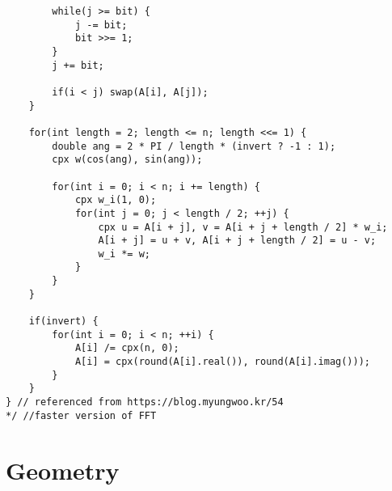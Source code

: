 \documentclass[landscape, 8pt, a4paper, oneside, twocolumn]{extarticle}
\begin{document}
\begin{verbatim}
        while(j >= bit) {
            j -= bit;
            bit >>= 1;
        }
        j += bit;

        if(i < j) swap(A[i], A[j]);
    }    

    for(int length = 2; length <= n; length <<= 1) {
        double ang = 2 * PI / length * (invert ? -1 : 1);
        cpx w(cos(ang), sin(ang));

        for(int i = 0; i < n; i += length) {
            cpx w_i(1, 0);
            for(int j = 0; j < length / 2; ++j) {
                cpx u = A[i + j], v = A[i + j + length / 2] * w_i;
                A[i + j] = u + v, A[i + j + length / 2] = u - v;
                w_i *= w;
            }
        }
    }
    
    if(invert) {
        for(int i = 0; i < n; ++i) {
            A[i] /= cpx(n, 0);
            A[i] = cpx(round(A[i].real()), round(A[i].imag()));
        }
    }
} // referenced from https://blog.myungwoo.kr/54
*/ //faster version of FFT
\end{verbatim}

\section{Geometry}
\end{document}

